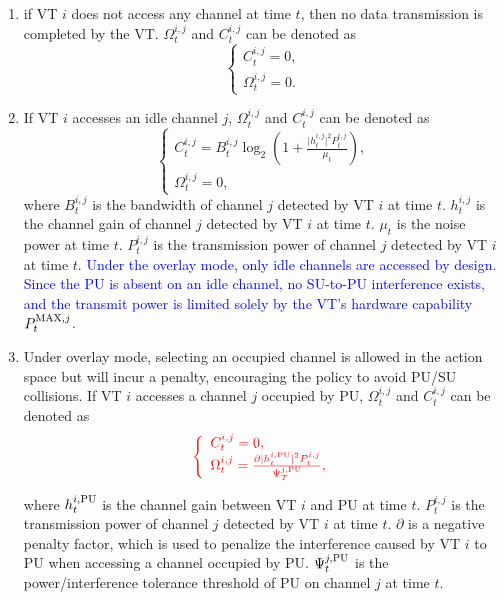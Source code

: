 \documentclass[journal]{IEEEtran}
\newcommand{\revise}[1]{\textcolor{blue}{#1}}
\begin{document}
\begin{enumerate}
	\item if VT $i$ does not access  any channel at time $t$, then  no data transmission is completed by the VT. $\Omega _t^{i,j}$ and $C_t^{i,j}$ can be denoted as
    \begin{equation}
		\left\{ \begin{array}{l}C_t^{i,j} = 0,\\
\Omega _t^{i,j} = 0.
\end{array} \right.
\label{eq:no_access}
	\end{equation}
	\item If VT $i$ accesses an idle channel $j$, $\Omega _t^{i,j}$ and $C_t^{i,j}$ can be denoted as
\begin{equation}
\left\{ \begin{array}{l}
C_t^{i,j} = B_t^{i,j}{\log _2}(1 + \frac{{|h_t^{i,j}{|^2}P_t^{i,j}}}{{{\mu _t}}}),\\
\Omega _t^{i,j} = 0,
\end{array} \right.
\label{eq:access_idle}
\end{equation}
where $B_t^{i,j}$ is the bandwidth of channel $j$ detected by VT $i$ at time $t$. $h_t^{i,j}$ is the channel gain of channel $j$ detected by VT $i$ at time $t$. $\mu_t$ is the noise power at time $t$. 
    $P_t^{i,j}$ is the transmission power of channel $j$ detected by VT $i$ at time $t$. \revise{Under the overlay mode, only idle channels are accessed by design. Since the PU is absent on an idle channel, no SU-to-PU interference exists,
	and the transmit power is limited solely by the VT's hardware capability $P_t^{{\rm{MAX}},j}$.}
	\item Under overlay mode, selecting an occupied channel is allowed in the action space but will incur a penalty, encouraging the policy to avoid PU/SU collisions. If VT $i$ accesses a channel $j$ occupied by PU, $\Omega _t^{i,j}$ and $C_t^{i,j}$ can be denoted as
	\begin{equation}
{\color{red}
\left\{ \begin{array}{l}
C_t^{i,j} = 0,\\
\Omega _t^{i,j} = \frac{{\partial |h_t^{i,{\rm{PU}}}{|^2}P_t^{i,j}}}{{\Psi _T^{j,{\rm{PU}}}}},
\end{array} \right.
}
	\end{equation}
\par where $h_t^{i,{\rm{PU}}}$ is the channel gain between VT $i$ and PU at time $t$. $P_t^{i,j}$ is the transmission power of channel $j$ detected by VT $i$ at time $t$. $\partial$ is a negative penalty factor, which is used to penalize the interference caused by VT $i$ to PU when accessing a channel occupied by PU. $\Psi _t^{j, {\rm{PU}}}$ is the power/interference tolerance threshold of PU on channel $j$ at time $t$. 


\end{enumerate}
\end{document}
